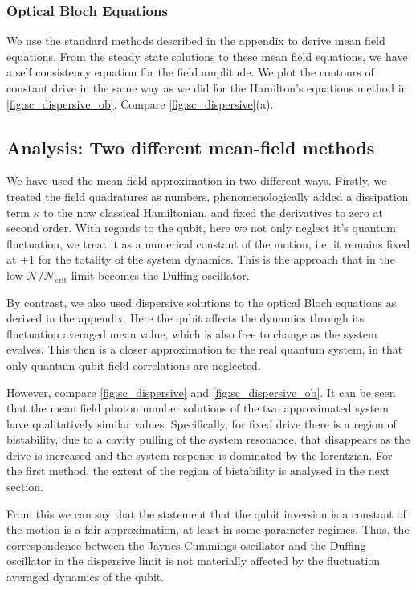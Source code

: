 \subsubsection{Optical Bloch Equations}
We use the standard methods described in the appendix to derive mean field equations.
From the steady state solutions to these mean field equations, we have a self consistency equation for the field amplitude.
We plot the contours of constant drive in the same way as we did for the Hamilton's equations method in \cref{fig:sc_dispersive_ob}. Compare \cref{fig:sc_dispersive}(a).
\subsection{Analysis: Two different mean-field methods}
We have used the mean-field approximation in two different ways.
Firstly, we treated the field quadratures as numbers, phenomenologically added a dissipation term $\kappa$ to the now classical Hamiltonian, and fixed the derivatives to zero at second order. 
With regards to the qubit, here we not only neglect it's quantum fluctuation, we treat it as a numerical constant of the motion, i.e. it remains fixed at $\pm1$ for the totality of the system dynamics. 
This is the approach that in the low $\mathscr{N}/\mathscr{N}_\text{crit}$ limit becomes the Duffing oscillator. 

By contrast, we also used dispersive solutions to the optical Bloch equations as derived in the appendix. Here the qubit affects the dynamics through its fluctuation averaged mean value, which is also free to change as the system evolves. 
This then is a closer approximation to the real quantum system, in that only quantum qubit-field correlations are neglected. 

However, compare \cref{fig:sc_dispersive} and \cref{fig:sc_dispersive_ob}. 
It can be seen that the mean field photon number solutions of the two approximated system have qualitatively similar values. 
Specifically, for fixed drive there is a region of bistability, due to a cavity pulling of the system resonance, that disappears as the drive is increased and the system response is dominated by the lorentzian. 
For the first method, the extent of the region of bistability is analysed in the next section. 

From this we can say that the statement that the qubit inversion is a constant of the motion is a fair approximation, at least in some parameter regimes. 
Thus, the correspondence between the Jaynes-Cummings oscillator and the Duffing oscillator in the dispersive limit is not materially affected by the fluctuation averaged dynamics of the qubit. 
